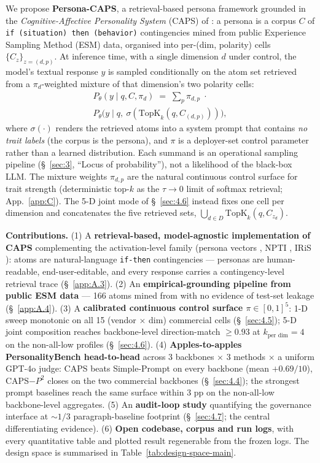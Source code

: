 We propose \textbf{Persona-CAPS}, a retrieval-based persona framework grounded in the \textit{Cognitive-Affective Personality System} (CAPS) of \citet{mischel1995caps}: a persona is a corpus $C$ of \texttt{if (situation) then (behavior)} contingencies mined from public Experience Sampling Method (ESM) data, organised into per-(dim, polarity) cells $\{C_z\}_{z=(d,p)}$. At inference time, with a single dimension $d$ under control, the model's textual response $y$ is sampled conditionally on the atom set retrieved from a $\pi_d$-weighted mixture of that dimension's two polarity cells:
\begin{multline*}
P_\theta(y \mid q, C, \pi_d) \;=\; \sum_{p} \pi_{d,p} \;\cdot\; \\
P_\theta\big(y \mid q,\ \sigma(\mathrm{TopK}_k(q, C_{(d,p)}))\big),
\end{multline*}
where $\sigma(\cdot)$ renders the retrieved atoms into a system prompt that contains \textit{no trait labels} (the corpus is the persona), and $\pi$ is a deployer-set control parameter rather than a learned distribution. Each summand is an operational sampling pipeline (\S~\ref{sec:3}, ``Locus of probability''), not a likelihood of the black-box LLM. The mixture weights $\pi_{d,p}$ are the natural continuous control surface for trait strength (deterministic top-$k$ as the $\tau \to 0$ limit of softmax retrieval; App.~\ref{app:C}). The 5-D joint mode of \S~\ref{sec:4.6} instead fixes one cell per dimension and concatenates the five retrieved sets, $\bigcup_{d \in D} \mathrm{TopK}_k(q, C_{z_d})$.

\textbf{Contributions.} (1) A \textbf{retrieval-based, model-agnostic implementation of CAPS} complementing the activation-level family (persona vectors \cite{anthropic2025personas}, NPTI \cite{NPTI}, IRiS \cite{IRiS}): atoms are natural-language \texttt{if-\allowbreak{}then} contingencies --- personas are human-readable, end-user-editable, and every response carries a contingency-level retrieval trace (\S~\ref{app:A.3}). (2) An \textbf{empirical-grounding pipeline from public ESM data} --- 166 atoms mined from \citet{beck2022esm} with no evidence of test-set leakage (\S~\ref{app:A.4}). (3) A \textbf{calibrated continuous control surface $\pi \in [0,1]^5$}: 1-D sweep monotonic on all 15 (vendor $\times$ dim) commercial cells (\S~\ref{sec:4.5}); 5-D joint composition reaches backbone-level direction-match $\geq 0.93$ at $k_\text{per dim}{=}4$ on the non-all-low profiles (\S~\ref{sec:4.6}). (4) \textbf{Apples-to-apples PersonalityBench head-to-head} across 3 backbones $\times$ 3 methods $\times$ a uniform GPT-4o judge: CAPS beats Simple-Prompt on every backbone (mean $+0.69/10$), CAPS$-$$P^{\!2}$ closes on the two commercial backbones (\S~\ref{sec:4.4}); the strongest prompt baselines reach the same surface within 3 pp on the non-all-low backbone-level aggregates. (5) An \textbf{audit-loop study} quantifying the governance interface at $\sim 1/3$ paragraph-baseline footprint (\S~\ref{sec:4.7}; the central differentiating evidence). (6) \textbf{Open codebase, corpus and run logs}, with every quantitative table and plotted result regenerable from the frozen logs. The design space is summarised in Table~\ref{tab:design-space-main}.

